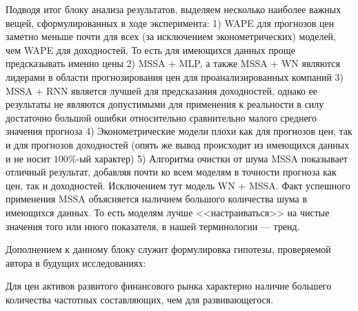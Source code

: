 Подводя итог блоку анализа результатов, выделяем несколько наиболее важных вещей, сформулированных в ходе эксперимента: 1) WAPE для прогнозов цен заметно меньше почти для всех (за исключением эконометрических) моделей, чем WAPE для доходностей. То есть для имеющихся данных проще предсказывать именно цены 2) MSSA + MLP, а также MSSA + WN являются лидерами в области прогнозирования цен для проанализированных компаний 3) MSSA + RNN является лучшей для предсказания доходностей, однако ее результаты не являются допустимыми для применения к реальности в силу достаточно большой ошибки относительно сравнительно малого среднего значения прогноза 4) Эконометрические модели плохи как для прогнозов цен, так и для прогнозов доходностей (опять же вывод происходит из имеющихся данных и не носит $100\%$-ый характер) 5) Алгоритма очистки от шума MSSA показывает отличный результат, добавляя почти ко всем моделям в точности прогноза как цен, так и доходностей. Исключением тут модель WN + MSSA. Факт успешного применения MSSA объясняется наличием большого количества шума в имеющихся данных. То есть моделям лучше <<настраиваться>> на чистые значения того или иного показателя, в нашей терминологии --- тренд.

Дополнением к данному блоку служит формулировка гипотезы, проверяемой автора в будущих исследованиях:
\begin{uncertainty}
	Для цен активов развитого финансового рынка характерно наличие большего количества частотных составляющих, чем для развивающегося.
\end{uncertainty}

